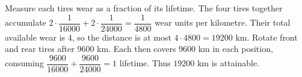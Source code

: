 Measure each tire\textquotesingle s wear as a fraction of its lifetime. The four tires together accumulate $2\cdot\dfrac{1}{16000}+2\cdot\dfrac{1}{24000}=\dfrac{1}{4800}$ wear units per kilometre. Their total available wear is 4, so the distance is at most $4\cdot4800=19200$ km. Rotate front and rear tires after 9600 km. Each then covers 9600 km in each position, consuming $\dfrac{9600}{16000}+\dfrac{9600}{24000}=1$ lifetime. Thus $\boxed{19200\text{ km}}$ is attainable.
